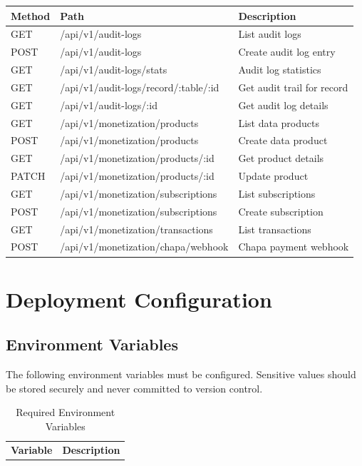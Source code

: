 \documentclass[12pt,a4paper,oneside]{report}
\begin{document}
\begin{appendix}
\begin{longtable}{lll}
\textbf{Method} & \textbf{Path} & \textbf{Description} \\

\endhead

\endfoot

\endlastfoot
GET & /api/v1/audit-logs & List audit logs \\
POST & /api/v1/audit-logs & Create audit log entry \\
GET & /api/v1/audit-logs/stats & Audit log statistics \\
GET & /api/v1/audit-logs/record/:table/:id & Get audit trail for record \\
GET & /api/v1/audit-logs/:id & Get audit log details \\
GET & /api/v1/monetization/products & List data products \\
POST & /api/v1/monetization/products & Create data product \\
GET & /api/v1/monetization/products/:id & Get product details \\
PATCH & /api/v1/monetization/products/:id & Update product \\
GET & /api/v1/monetization/subscriptions & List subscriptions \\
POST & /api/v1/monetization/subscriptions & Create subscription \\
GET & /api/v1/monetization/transactions & List transactions \\
POST & /api/v1/monetization/chapa/webhook & Chapa payment webhook \\
\end{longtable}

\clearpage
\chapter{Deployment Configuration}
\label{app:deployment}

\section{Environment Variables}
The following environment variables must be configured. Sensitive values should be stored securely and never committed to version control.

\begin{longtable}{ll}
\caption{Required Environment Variables} \\

\textbf{Variable} & \textbf{Description} \\


\end{longtable}
\end{appendix}
\end{document}
